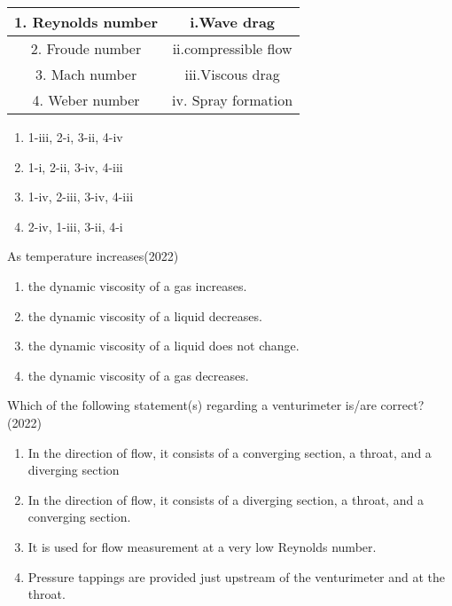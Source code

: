     \begin{table}
        \centering
        \begin{tabular}{|c|c|}
            \hline
           1. Reynolds number& i.Wave drag \\ \hline
            2. Froude number& ii.compressible flow \\ \hline
            3. Mach number & iii.Viscous drag \\ \hline
            4. Weber number & iv. Spray formation \\ \hline
        \end{tabular} %
        \caption{}
    \end{table}
    \begin{enumerate}[label = (\Alph*)]
        \item 1-iii, 2-i, 3-ii, 4-iv
        \item 1-i, 2-ii, 3-iv, 4-iii
        \item 1-iv, 2-iii, 3-iv, 4-iii
        \item 2-iv, 1-iii, 3-ii, 4-i
    \end{enumerate}
    \item As temperature increases\hfill (2022)
    \begin{enumerate}[label = (\Alph*)]
        \item the dynamic viscosity of a gas increases. 
        \item the dynamic viscosity of a liquid decreases.
        \item the dynamic viscosity of a liquid does not change.
        \item the dynamic viscosity of a gas decreases. 
    \end{enumerate}
    \item Which of the following statement(s) regarding a venturimeter is/are correct? \hfill (2022)
    \begin{enumerate}[label = (\Alph*)]
        \item In the direction of flow, it consists of a converging section, a throat, and a
        diverging section
        \item In the direction of flow, it consists of a diverging section, a throat, and a
        converging section.
        \item It is used for flow measurement at a very low Reynolds number.
        \item Pressure tappings are provided just upstream of the venturimeter and at the throat.
    \end{enumerate}

